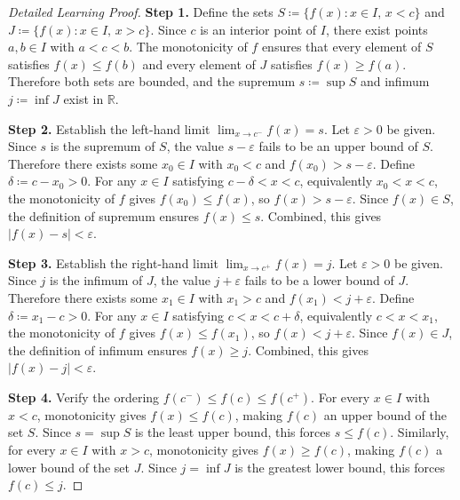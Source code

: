 \begin{proof}[Detailed Learning Proof]
\LRAProofBodyStart

\textbf{Step 1.} Define the sets $S \coloneqq \{f(x) : x \in I,\, x < c\}$ and $J \coloneqq \{f(x) : x \in I,\, x > c\}$. Since $c$ is an interior point of $I$, there exist points $a, b \in I$ with $a < c < b$. The monotonicity of $f$ ensures that every element of $S$ satisfies $f(x) \leq f(b)$ and every element of $J$ satisfies $f(x) \geq f(a)$. Therefore both sets are bounded, and the supremum $s \coloneqq \sup S$ and infimum $j \coloneqq \inf J$ exist in $\mathbb{R}$.

\textbf{Step 2.} Establish the left-hand limit $\lim_{x \to c^{-}} f(x) = s$. Let $\varepsilon > 0$ be given. Since $s$ is the supremum of $S$, the value $s - \varepsilon$ fails to be an upper bound of $S$. Therefore there exists some $x_0 \in I$ with $x_0 < c$ and $f(x_0) > s - \varepsilon$. Define $\delta \coloneqq c - x_0 > 0$. For any $x \in I$ satisfying $c - \delta < x < c$, equivalently $x_0 < x < c$, the monotonicity of $f$ gives $f(x_0) \leq f(x)$, so $f(x) > s - \varepsilon$. Since $f(x) \in S$, the definition of supremum ensures $f(x) \leq s$. Combined, this gives $|f(x) - s| < \varepsilon$.

\textbf{Step 3.} Establish the right-hand limit $\lim_{x \to c^{+}} f(x) = j$. Let $\varepsilon > 0$ be given. Since $j$ is the infimum of $J$, the value $j + \varepsilon$ fails to be a lower bound of $J$. Therefore there exists some $x_1 \in I$ with $x_1 > c$ and $f(x_1) < j + \varepsilon$. Define $\delta \coloneqq x_1 - c > 0$. For any $x \in I$ satisfying $c < x < c + \delta$, equivalently $c < x < x_1$, the monotonicity of $f$ gives $f(x) \leq f(x_1)$, so $f(x) < j + \varepsilon$. Since $f(x) \in J$, the definition of infimum ensures $f(x) \geq j$. Combined, this gives $|f(x) - j| < \varepsilon$.

\textbf{Step 4.} Verify the ordering $f(c^{-}) \leq f(c) \leq f(c^{+})$. For every $x \in I$ with $x < c$, monotonicity gives $f(x) \leq f(c)$, making $f(c)$ an upper bound of the set $S$. Since $s = \sup S$ is the least upper bound, this forces $s \leq f(c)$. Similarly, for every $x \in I$ with $x > c$, monotonicity gives $f(x) \geq f(c)$, making $f(c)$ a lower bound of the set $J$. Since $j = \inf J$ is the greatest lower bound, this forces $f(c) \leq j$.
\end{proof}

